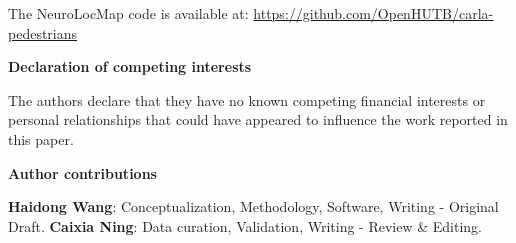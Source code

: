 \documentclass[twocolumn,journal]{IEEEtran}
\begin{document}
The NeuroLocMap code is available at: \url{https://github.com/OpenHUTB/carla-pedestrians}

\vspace{1em}
\noindent \textbf{Declaration of competing interests}
\vspace{0.5em}

The authors declare that they have no known competing financial interests or personal relationships that could have appeared to influence the work reported in this paper.

\vspace{1em}
\noindent \textbf{Author contributions}
\vspace{0.5em}

\textbf{Haidong Wang}: Conceptualization, Methodology, Software, Writing - Original Draft. \textbf{Caixia Ning}: Data curation, Validation, Writing - Review \& Editing.



\end{document}
